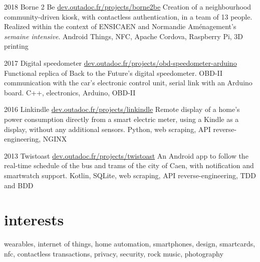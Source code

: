 \documentclass[]{friggeri-cv}
\begin{document}
\begin{entrylist}
    \entry
    {2018}
    {Borne 2 Be}
    {\href{https://dev.outadoc.fr/projects/borne2be}{dev.outadoc.fr/projects/borne2be}}
    {Creation of a neighbourhood community-driven kiosk, with contactless authentication, in a team of 13 people. Realized within the context of ENSICAEN and Normandie Aménagement's \textit{semaine intensive}.}
    {Android Things, NFC, Apache Cordova, Raspberry Pi, 3D printing}
    
    \entry
    {2017}
    {Digital speedometer}
    {\href{https://dev.outadoc.fr/projects/obd-speedometer-arduino}{dev.outadoc.fr/projects/obd-speedometer-arduino}}
    {Functional replica of Back to the Future's digital speedometer. OBD-II communication with the car's electronic control unit, serial link with an Arduino board.}
    {C++, electronics, Arduino, OBD-II}
    
    \entry
    {2016}
    {Linkindle}
    {\href{https://dev.outadoc.fr/projects/linkindle}{dev.outadoc.fr/projects/linkindle}}
    {Remote display of a home's power consumption directly from a smart electric meter, using a Kindle as a display, without any additional sensors.}
    {Python, web scraping, API reverse-engineering, NGINX}
    
    \entry
    {2013}
    {Twistoast}
    {\href{https://dev.outadoc.fr/projects/twistoast}{dev.outadoc.fr/projects/twistoast}}
    {An Android app to follow the real-time schedule of the bus and trams of the city of Caen, with notification and smartwatch support.}
    {Kotlin, SQLite, web scraping, API reverse-engineering, TDD and BDD}
\end{entrylist}

\section{interests}

wearables, internet of things, home automation, smartphones, design, smartcards, nfc, contactless transactions, privacy, security, rock music, photography
\end{document}
